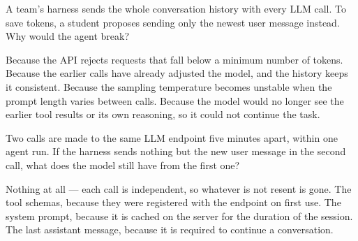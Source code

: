 %
%
%



\qitem A team's harness sends the whole conversation history with every LLM call. To save tokens, a
student proposes sending only the newest user message instead. Why would the agent break?
\begin{choices}
  \choice Because the API rejects requests that fall below a minimum number of tokens.
  \choice Because the earlier calls have already adjusted the model, and the history keeps it consistent.
  \choice Because the sampling temperature becomes unstable when the prompt length varies between calls.
  \CorrectChoice Because the model would no longer see the earlier tool results or its own reasoning, so it could not continue the task.
\end{choices}
\dontknow
{}

\qitem Two calls are made to the same LLM endpoint five minutes apart, within one agent run. If the
harness sends nothing but the new user message in the second call, what does the model still have from the
first one?
\begin{choices}
  \CorrectChoice Nothing at all --- each call is independent, so whatever is not resent is gone.
  \choice The tool schemas, because they were registered with the endpoint on first use.
  \choice The system prompt, because it is cached on the server for the duration of the session.
  \choice The last assistant message, because it is required to continue a conversation.
\end{choices}
\dontknow
{}


